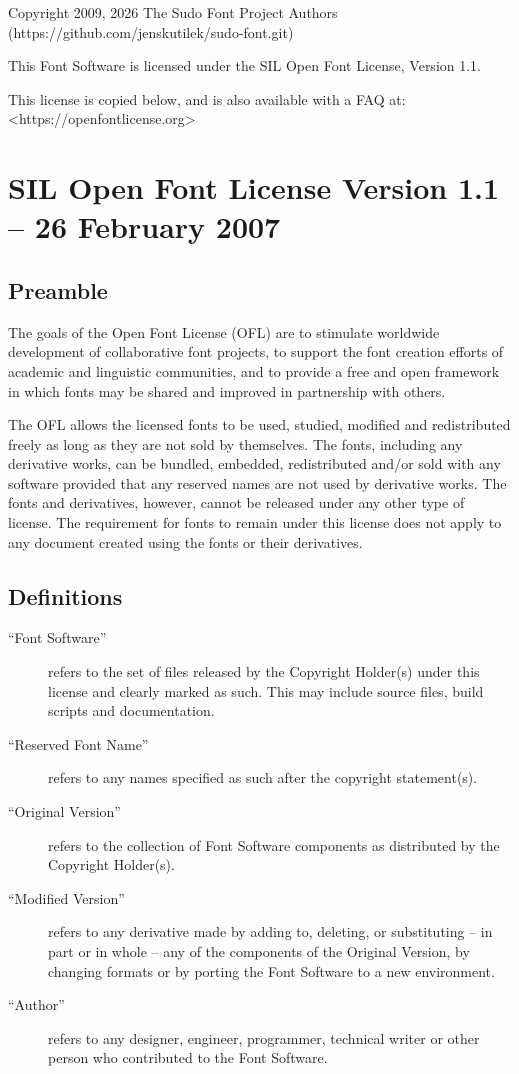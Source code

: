 \documentclass[paper=a4, 10pt]{scrbook}
\begin{document}
Copyright 2009, 2026 The Sudo Font Project Authors (https://github.com/jenskutilek/sudo-font.git)

This Font Software is licensed under the SIL Open Font License, Version 1.1.

This license is copied below, and is also available with a FAQ at: <https://openfontlicense.org>


\section{SIL Open Font License Version 1.1 – 26 February 2007}

\subsection{Preamble}

The goals of the Open Font License (OFL) are to stimulate worldwide development of collaborative font projects, to support the font creation efforts of academic and linguistic communities, and to provide a free and open framework in which fonts may be shared and improved in partnership with others.

The OFL allows the licensed fonts to be used, studied, modified and redistributed freely as long as they are not sold by themselves. The fonts, including any derivative works, can be bundled, embedded, redistributed and/or sold with any software provided that any reserved names are not used by derivative works. The fonts and derivatives, however, cannot be released under any other type of license. The requirement for fonts to remain under this license does not apply to any document created using the fonts or their derivatives.

\subsection{Definitions}

\begin{description}
	\item[“Font Software”] refers to the set of files released by the Copyright Holder(s) under this license and clearly marked as such. This may include source files, build scripts and documentation.

	\item[“Reserved Font Name”] refers to any names specified as such after the copyright statement(s).

	\item[“Original Version”] refers to the collection of Font Software components as distributed by the Copyright Holder(s).

	\item[“Modified Version”] refers to any derivative made by adding to, deleting, or substituting – in part or in whole – any of the components of the Original Version, by changing formats or by porting the Font Software to a new environment.

	\item[“Author”] refers to any designer, engineer, programmer, technical writer or other person who contributed to the Font Software.
\end{description}
\end{document}

